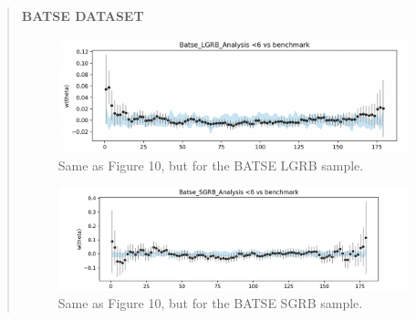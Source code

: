 \documentclass[12pt]{article}
\begin{document}
\begin{quote}
    \textbf{BATSE DATASET}\\
    \begin{center}
    \begin{figure}
        \centering
        \includegraphics{BATSE LGRB 2pACF.png}
        \caption{Same as Figure 10, but for the BATSE LGRB sample.}
        \label{fig:enter-label}
    \end{figure}
    \begin{figure}
        \centering
        \includegraphics{BATSE SGRB 2pACF.png}
        \caption{Same as Figure 10, but for the BATSE SGRB sample.}
        \label{fig:enter-label}
    \end{figure}
    \end{center}
\end{quote}
\newpage
\end{document}
